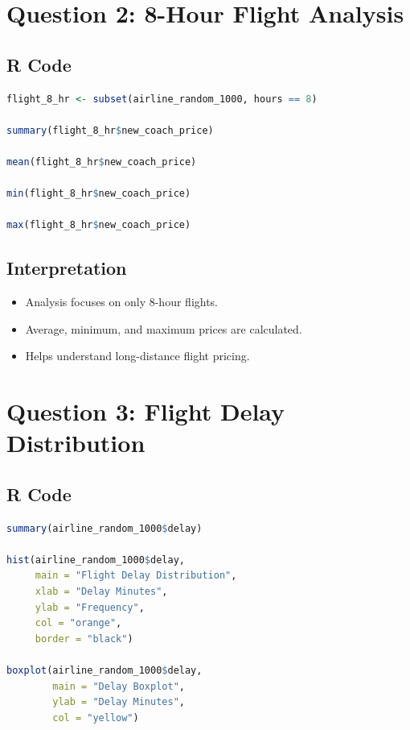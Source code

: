 \documentclass[12pt,a4paper]{article}
\begin{document}
\section{Question 2: 8-Hour Flight Analysis}

\subsection{R Code}

\begin{lstlisting}[language=R]
flight_8_hr <- subset(airline_random_1000, hours == 8)

summary(flight_8_hr$new_coach_price)

mean(flight_8_hr$new_coach_price)

min(flight_8_hr$new_coach_price)

max(flight_8_hr$new_coach_price)
\end{lstlisting}

\subsection{Interpretation}

\begin{itemize}
\item Analysis focuses on only 8-hour flights.
\item Average, minimum, and maximum prices are calculated.
\item Helps understand long-distance flight pricing.
\end{itemize}


\section{Question 3: Flight Delay Distribution}

\subsection{R Code}

\begin{lstlisting}[language=R]
summary(airline_random_1000$delay)

hist(airline_random_1000$delay,
     main = "Flight Delay Distribution",
     xlab = "Delay Minutes",
     ylab = "Frequency",
     col = "orange",
     border = "black")

boxplot(airline_random_1000$delay,
        main = "Delay Boxplot",
        ylab = "Delay Minutes",
        col = "yellow")
\end{lstlisting}
\end{document}
